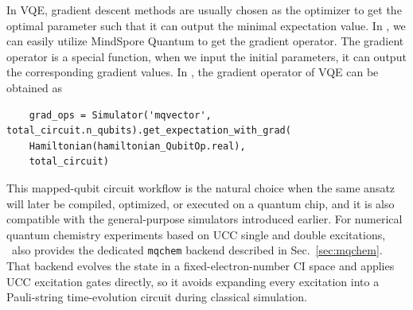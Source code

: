 In VQE, gradient descent methods are usually chosen as the optimizer to get the optimal parameter such that it can output the minimal expectation value.
In \MindQuantum, we can easily utilize MindSpore Quantum to get the gradient operator.
The gradient operator is a special function, when we input the initial parameters, it can output the corresponding gradient values.
In \MindQuantum, the gradient operator of VQE can be obtained as
\begin{lstlisting}
    grad_ops = Simulator('mqvector', total_circuit.n_qubits).get_expectation_with_grad(
    Hamiltonian(hamiltonian_QubitOp.real),
    total_circuit)
\end{lstlisting}
This mapped-qubit circuit workflow is the natural choice when the same ansatz will later be compiled, optimized, or executed on a quantum chip, and it is also compatible with the general-purpose simulators introduced earlier. For numerical quantum chemistry experiments based on UCC single and double excitations, \MindQuantum\ also provides the dedicated \texttt{mqchem} backend described in Sec.~\ref{sec:mqchem}. That backend evolves the state in a fixed-electron-number CI space and applies UCC excitation gates directly, so it avoids expanding every excitation into a Pauli-string time-evolution circuit during classical simulation.

